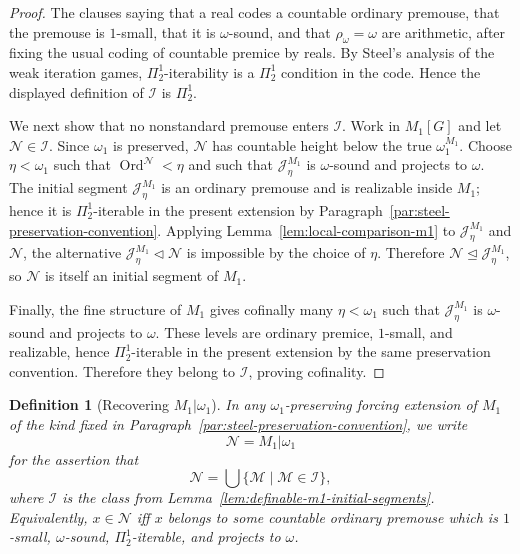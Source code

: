 \documentclass[a4paper,11pt]{article}
\newtheorem{definition}[theorem]{Definition}
\begin{document}
\begin{proof}
The clauses saying that a real codes a countable ordinary premouse, that the premouse is $1$-small, that it is $\omega$-sound, and that $\rho_\omega=\omega$ are arithmetic, after fixing the usual coding of countable premice by reals.  By Steel's analysis of the weak iteration games, $\Pi^1_2$-iterability is a $\Pi^1_2$ condition in the code.  Hence the displayed definition of $\mathcal I$ is $\Pi^1_2$.

We next show that no nonstandard premouse enters $\mathcal I$.  Work in $M_1[G]$ and let $\mathcal N\in\mathcal I$.  Since $\omega_1$ is preserved, $\mathcal N$ has countable height below the true $\omega_1^{M_1}$.  Choose $\eta<\omega_1$ such that $\operatorname{Ord}^{\mathcal N}<\eta$ and such that $\mathcal J_\eta^{M_1}$ is $\omega$-sound and projects to $\omega$.  The initial segment $\mathcal J_\eta^{M_1}$ is an ordinary premouse and is realizable inside $M_1$; hence it is $\Pi^1_2$-iterable in the present extension by Paragraph~\ref{par:steel-preservation-convention}.  Applying Lemma~\ref{lem:local-comparison-m1} to $\mathcal J_\eta^{M_1}$ and $\mathcal N$, the alternative $\mathcal J_\eta^{M_1}\triangleleft\mathcal N$ is impossible by the choice of $\eta$.  Therefore $\mathcal N\trianglelefteq\mathcal J_\eta^{M_1}$, so $\mathcal N$ is itself an initial segment of $M_1$.

Finally, the fine structure of $M_1$ gives cofinally many $\eta<\omega_1$ such that $\mathcal J_\eta^{M_1}$ is $\omega$-sound and projects to $\omega$.  These levels are ordinary premice, $1$-small, and realizable, hence $\Pi^1_2$-iterable in the present extension by the same preservation convention.  Therefore they belong to $\mathcal I$, proving cofinality.
\end{proof}

\begin{definition}[Recovering $M_1|\omega_1$]\label{def:recover-m1-omega1}
In any $\omega_1$-preserving forcing extension of $M_1$ of the kind fixed in Paragraph~\ref{par:steel-preservation-convention}, we write
\[
   \mathcal N=M_1|\omega_1
\]
for the assertion that
\[
   \mathcal N=\bigcup\{\mathcal M\mid \mathcal M\in\mathcal I\},
\]
where $\mathcal I$ is the class from Lemma~\ref{lem:definable-m1-initial-segments}.
Equivalently, $x\in\mathcal N$ iff $x$ belongs to some countable ordinary premouse which is $1$-small, $\omega$-sound, $\Pi^1_2$-iterable, and projects to $\omega$.
\end{definition}
\end{document}
